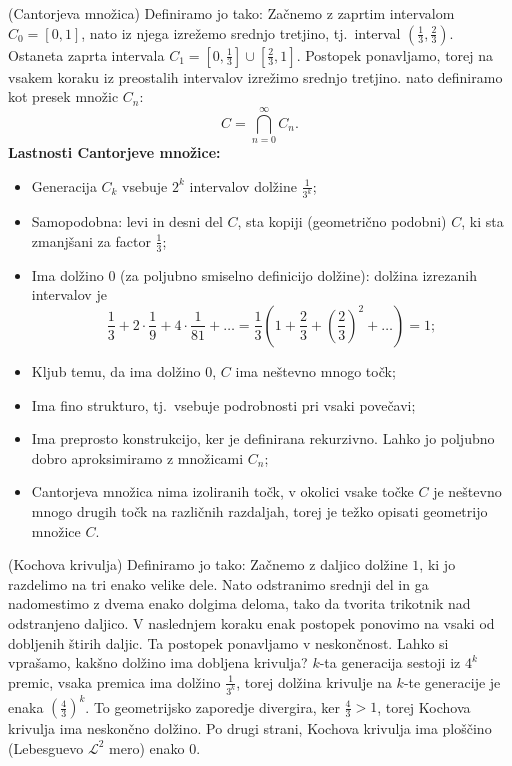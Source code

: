 \begin{primer}(Cantorjeva množica)
    Definiramo jo tako: Začnemo z zaprtim intervalom \(C_0 = [0,1]\), nato iz njega izrežemo srednjo tretjino, tj.\ interval \((\frac{1}{3}, \frac{2}{3})\). Ostaneta zaprta intervala \(C_1 = [0, \frac{1}{3}] \cup [\frac{2}{3}, 1]\). Postopek ponavljamo, torej na vsakem koraku iz preostalih intervalov izrežimo srednjo tretjino.  nato definiramo kot presek množic \(C_n\): \[C = \bigcap_{n = 0}^\infty C_n.\]
    \textbf{Lastnosti Cantorjeve množice:}
    \begin{itemize}
        \item Generacija \(C_k\) vsebuje \(2^k\) intervalov dolžine \(\frac{1}{3^k}\);
        \item Samopodobna: levi in desni del \(C\), sta kopiji (geometrično podobni) \(C\), ki sta zmanjšani za factor \(\frac{1}{3}\);
        \item Ima dolžino \(0\) (za poljubno smiselno definicijo dolžine): dolžina izrezanih intervalov je \[\frac{1}{3} + 2 \cdot \frac{1}{9} + 4 \cdot \frac{1}{81} + \ldots = \frac{1}{3} \left(1 + \frac{2}{3} + \left(\frac{2}{3}\right)^2 + \ldots \right) = 1;\]
        \item Kljub temu, da ima dolžino \(0\), \(C\) ima neštevno mnogo točk;
        \item Ima fino strukturo, tj.\ vsebuje podrobnosti pri vsaki povečavi;
        \item Ima preprosto konstrukcijo, ker je definirana rekurzivno. Lahko jo poljubno dobro aproksimiramo z množicami \(C_n\);
        \item Cantorjeva množica nima izoliranih točk, v okolici vsake točke \(C\) je neštevno mnogo drugih točk na različnih razdaljah, torej je težko opisati geometrijo množice \(C\).
    \end{itemize}
\end{primer}

\begin{primer}(Kochova krivulja)
    Definiramo jo tako: Začnemo z daljico dolžine \(1\), ki jo razdelimo na tri enako velike dele. Nato odstranimo srednji del in ga nadomestimo z dvema enako dolgima deloma, tako da tvorita trikotnik nad odstranjeno daljico.
    V naslednjem koraku enak postopek ponovimo na vsaki od dobljenih štirih daljic. Ta postopek ponavljamo v neskončnost. Lahko si vprašamo, kakšno dolžino ima dobljena krivulja?    
    \(k\)-ta generacija sestoji iz \(4^k\) premic, vsaka premica ima dolžino \(\frac{1}{3^k}\), torej dolžina krivulje na \(k\)-te generacije je enaka \(\left(\frac{4}{3}\right)^k\). To geometrijsko zaporedje divergira, ker \(\frac{4}{3} > 1\), torej Kochova krivulja ima neskončno dolžino. Po drugi strani, Kochova krivulja ima ploščino (Lebesguevo \(\mathcal{L}^2\) mero) enako \(0\).
\end{primer}


